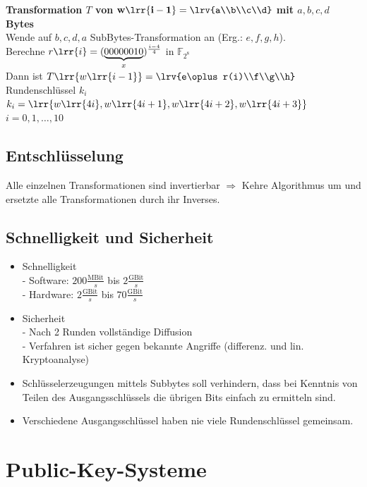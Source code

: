 		\textbf{Transformation $T$ von} $\mathbf{w\lrr{i-1}=\lrv{a\\b\\c\\d}}$ \textbf{mit $a,b,c,d$ Bytes}\\
		Wende auf $b,c,d,a$ SubBytes-Transformation an (Erg.: $e,f,g,h$).\\
		Berechne $r\lrr{i}=(\underbrace{00000010}_{x})^{\frac{i-4}{4}}$ in $\mathbb{F}_{2^8}$\\
		Dann ist $T\lrr{w\lrr{i-1}}=\lrv{e\oplus r(i)\\f\\g\\h}$ Rundenschlüssel $k_i$\\
		$k_i=\lrr{w\lrr{4i},w\lrr{4i+1},w\lrr{4i+2},w\lrr{4i+3}}$\\
		$i=0,1,\dots,10$
		
	\subsection{Entschlüsselung}
		Alle einzelnen Transformationen sind invertierbar $\Rightarrow$ Kehre Algorithmus um und ersetzte alle Transformationen durch ihr Inverses.
		
	\subsection{Schnelligkeit und Sicherheit}
		\begin{itemize}
			\item Schnelligkeit\\
				- Software: $200\frac{\text{MBit}}{s}$ bis $2\frac{\text{GBit}}{s}$\\
				- Hardware: $2\frac{\text{GBit}}{s}$ bis $70\frac{\text{GBit}}{s}$
			\item Sicherheit\\
				- Nach 2 Runden vollständige Diffusion\\
				- Verfahren ist sicher gegen bekannte Angriffe (differenz. und lin. Kryptoanalyse)
			\item Schlüsselerzeugungen mittels Subbytes soll verhindern, dass bei Kenntnis von Teilen des Ausgangsschlüssels die übrigen Bits einfach zu ermitteln sind.
			\item Verschiedene Ausgangsschlüssel haben nie viele Rundenschlüssel gemeinsam.
		\end{itemize}
	
\section{Public-Key-Systeme}
